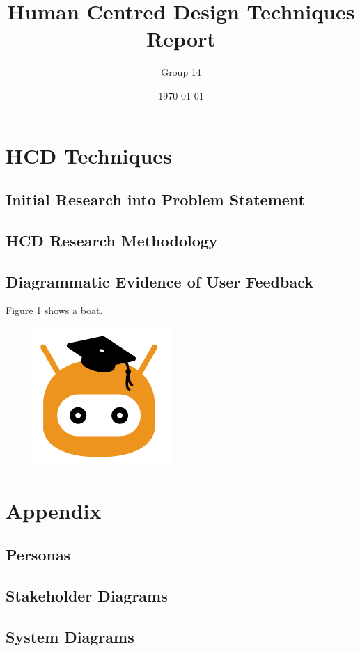 \documentclass[a4wide, 11pt]{article}
\begin{document}
\title{Human Centred Design Techniques Report}

\author{Group 14}

\date{\today}         %

\maketitle            %

\section{HCD Techniques}

\subsection{Initial Research into Problem Statement} 

\subsection{HCD Research Methodology}

\subsection{Diagrammatic Evidence of User Feedback}

Figure \ref{fig:mockup} shows a boat.

\begin{figure}
  \begin{center}
  \includegraphics[]{placeholder.png}
  \end{center}
  \label{fig:mockup}
\end{figure}


\section{Appendix}

\subsection{Personas}

\subsection{Stakeholder Diagrams}

\subsection{System Diagrams}
\end{document}
